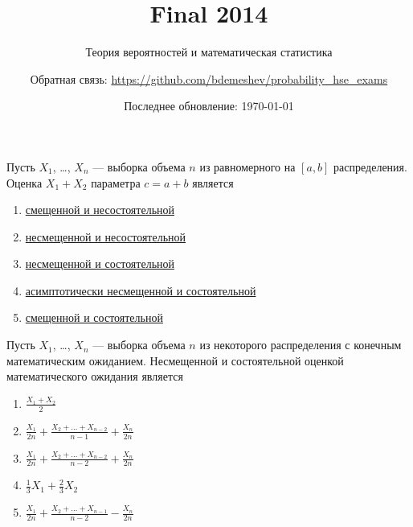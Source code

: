 \documentclass[t]{beamer}
\title{Final 2014}
\subtitle{Теория вероятностей и математическая статистика}
\author{Обратная связь: \url{https://github.com/bdemeshev/probability_hse_exams}}
\date{Последнее обновление: \today}
\begin{document}
 

\frame[plain]{\titlepage}

 \begin{frame} \label{1} 
\begin{block}{1} 

Пусть $X_1$, \ldots, $X_n$ — выборка объема $n$ из равномерного на $[a, b]$ распределения. Оценка $X_1+X_2$ параметра $c=a+b$ является
 


 \end{block} 
\begin{enumerate} 
\item[] \hyperlink{1-No}{\beamergotobutton{} смещенной и несостоятельной}
\item[] \hyperlink{1-Yes}{\beamergotobutton{} несмещенной и несостоятельной}
\item[] \hyperlink{1-No}{\beamergotobutton{} несмещенной и состоятельной}
\item[] \hyperlink{1-No}{\beamergotobutton{} асимптотически несмещенной и состоятельной}
\item[] \hyperlink{1-No}{\beamergotobutton{} смещенной и состоятельной}
\end{enumerate} 
\end{frame} 


 \begin{frame} \label{2} 
\begin{block}{2} 

Пусть $X_1$, \ldots, $X_n$ — выборка объема $n$ из некоторого распределения с конечным математическим ожиданием. Несмещенной и состоятельной оценкой математического ожидания является
 


 \end{block} 
\begin{enumerate} 
\item[] \hyperlink{2-No}{\beamergotobutton{} $\frac{X_1+X_2}{2}$}
\item[] \hyperlink{2-No}{\beamergotobutton{} $\frac{X_1}{2 n}+\frac{X_2+\ldots+X_{n-2}}{n-1}+\frac{X_n}{2 n}$}
\item[] \hyperlink{2-No}{\beamergotobutton{} $\frac{X_1}{2 n}+\frac{X_2+\ldots+X_{n-2}}{n-2}+\frac{X_n}{2 n}$}
\item[] \hyperlink{2-No}{\beamergotobutton{} $\frac{1}{3} X_1 + \frac{2}{3} X_2$}
\item[] \hyperlink{2-Yes}{\beamergotobutton{} $\frac{X_1}{2 n}+\frac{X_2+\ldots+X_{n-1}}{n-2}-\frac{X_n}{2 n}$}
\end{enumerate} 
\end{frame} 
\end{document}
